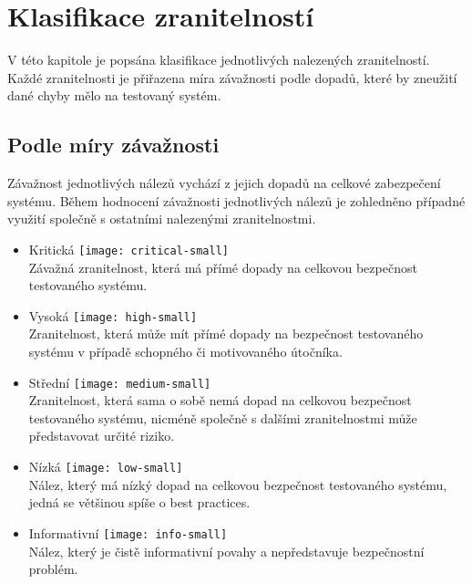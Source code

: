 \section{Klasifikace zranitelností}
V této kapitole je popsána klasifikace jednotlivých nalezených zranitelností. Každé zranitelnosti je přiřazena míra závažnosti podle dopadů, které by zneužití dané chyby mělo na testovaný systém.

\subsection{Podle míry závažnosti}
Závažnost jednotlivých nálezů vychází z jejich dopadů na celkové zabezpečení systému.
Během hodnocení závažnosti jednotlivých nálezů je zohledněno případné využití společně s ostatními nalezenými zranitelnostmi.


\begin{itemize}
\item Kritická \nobreak\smallskip\protect\texttt{[image: critical-small]} \\
Závažná zranitelnost, která má přímé dopady na celkovou bezpečnost testovaného systému.

\item Vysoká \nobreak\smallskip\protect\texttt{[image: high-small]} \\
Zranitelnost, která může mít přímé dopady na bezpečnost testovaného systému v případě schopného či motivovaného útočníka.

\item Střední \nobreak\smallskip\protect\texttt{[image: medium-small]} \\
Zranitelnost, která sama o sobě nemá dopad na celkovou bezpečnost testovaného systému, nicméně společně s dalšími zranitelnostmi může představovat určité riziko.

\item Nízká \nobreak\smallskip\protect\texttt{[image: low-small]} \\
Nález, který má nízký dopad na celkovou bezpečnost testovaného systému, jedná se většinou spíše o best practices.

\item Informativní \nobreak\smallskip\protect\texttt{[image: info-small]} \\
Nález, který je čistě informativní povahy a nepředstavuje bezpečnostní problém.

\end{itemize}

